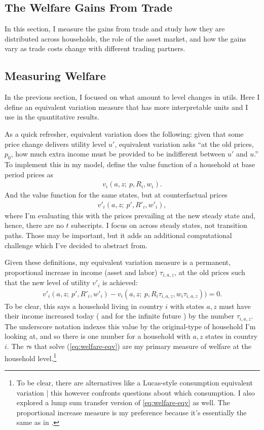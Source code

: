 \documentclass[12pt,pdftex]{article}
\begin{document}
\begin{onehalfspacing}
\section{The Welfare Gains From Trade}

In this section, I measure the gains from trade and study how they are distributed across households, the role of the asset market, and how the gains vary as trade costs change with different trading partners.

\subsection{Measuring Welfare}

In the previous section, I focused on what amount to level changes in utils. Here I define an equivalent variation measure that has more interpretable units and I use in the quantitative results.

As a quick refresher, equivalent variation does the following: given that some price change delivers utility level $u'$, equivalent variation asks ``at the old prices, $p_0$, how much extra income must be provided to be indifferent between $u'$ and $u$.'' To implement this in my model, define the value function of a household at base period prices as
\begin{align}
v_i(a, z ; \ p, R_{i}, w_{i}).
\end{align}
And the value function for the same states, but at counterfactual prices
\begin{align}
v'_i(a, z ; \ p', R'_{i}, w'_{i}), \label{eq:welfare-eqv-cftc}
\end{align}
where I'm evaluating this with the prices prevailing at the new steady state and, hence, there are no $t$ subscripts. I focus on across steady states, not transition paths. Those may be important, but it adds an additional computational challenge which I've decided to abstract from.

Given these definitions, my equivalent variation measure is a permanent, proportional increase in income (asset and labor) $\tau_{i,a,z}$, at the old prices such that the new level of utility $v'_i$ is achieved:
\begin{align}
v'_i(a, z ; \ p', R'_{i}, w'_{i}) - v_i(a, z ; \ p, R_{i}\tau_{i,a,z}, w_{i}\tau_{i,a,z})) = 0. \label{eq:welfare-eqv}
\end{align}
To be clear, this says a household living in country $i$ with states $a,z$ must have their income increased today ( and for the infinite future ) by the number $\tau_{i,a,z}$. The underscore notation indexes this value by the original-type of household I'm looking at, and so there is one number for a household with $a,z$ states in country $i$. The $\tau$s that solve (\ref{eq:welfare-eqv}) are my primary measure of welfare at the household level.\footnote{To be clear, there are alternatives like a Lucas-style consumption equivalent variation | this however confronts questions about which consumption. I also explored a lump sum transfer version of \ref{eq:welfare-eqv} as well. The proportional increase measure is my preference because it's essentially the same as in \citet{auer2022unequal}.}


\end{onehalfspacing}
\end{document}

